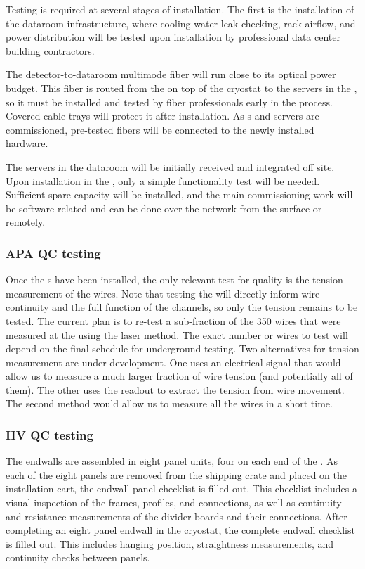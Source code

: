 Testing is required at several stages of  installation.  The first is the installation of the dataroom infrastructure, where cooling water leak checking, rack airflow, and power distribution will be tested upon installation by professional data center building contractors.

The detector-to-dataroom multimode fiber will run close to its optical power budget.  This fiber is routed from the  on top of the cryostat to the servers in the , so it must be installed and tested by fiber professionals early in the process.  Covered cable trays will protect it after installation.  As s and servers are commissioned, pre-tested fibers will be connected to the newly installed hardware.

The  servers in the  dataroom will be initially received and integrated off site.  Upon installation in the , only a simple functionality test will be needed.  Sufficient spare capacity will be installed, and the main commissioning work will be software related and can be done over the network from the surface or remotely.

\subsubsection{APA QC testing}

Once the s have been installed, the only relevant test for  quality is the tension measurement of the wires. 
Note that testing the  will directly inform wire continuity and the full function of the channels, so only the tension remains to be tested. 
The current plan is to re-test a sub-fraction of the 350 wires that were measured at the  using the laser method. 
The exact number or wires to test will depend on the final schedule for underground testing. 
Two alternatives for tension measurement are under development. 
One uses an electrical signal that would allow us to measure a much larger fraction of wire tension (and potentially all of them). 
The other uses the  readout to extract the tension from wire movement. 
The second method would allow us to measure all the wires in a short time.

\subsubsection{HV QC testing}

The endwalls are assembled in eight panel units, four on each end of the .  
As each of the eight panels are removed from the shipping crate and placed on the installation cart, the endwall panel checklist is filled out.\cite{bib:docdb10452}
This checklist includes a visual inspection of the frames, profiles, and connections, as well as continuity and resistance measurements of the divider boards and their connections.  
After completing an eight panel endwall in the cryostat, the complete endwall checklist is filled out.  
This includes hanging position, straightness measurements, and continuity checks between panels.

